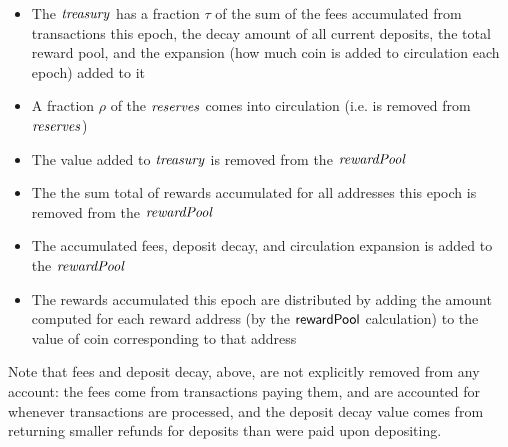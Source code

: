 \begin{itemize}
\item The $\mathit{treasury}$ has a fraction $\tau$ of the sum of
the fees accumulated from transactions this epoch, the decay amount
of all current deposits, the total reward pool, and the expansion (how much
coin is added to circulation each epoch) added to it
\item A fraction $\rho$ of the $\mathit{reserves}$ comes into circulation (i.e.
is removed from $\mathit{reserves}$)
\item The value added to $\mathit{treasury}$ is removed from the $\mathit{rewardPool}$
\item The the sum total of rewards accumulated for all addresses this epoch
is removed from the $\mathit{rewardPool}$
\item The accumulated fees, deposit decay, and circulation expansion is
added to the $\mathit{rewardPool}$
\item The rewards accumulated this epoch are distributed by
adding the amount computed for each reward address (by the $\mathsf{rewardPool}$ calculation)
to the value of coin corresponding to that address
\end{itemize}

Note that fees and deposit decay, above, are not explicitly removed from any account:
the fees come from transactions paying them, and are accounted for whenever
transactions are processed, and the deposit decay value comes from returning
smaller refunds for deposits than were paid upon depositing.

